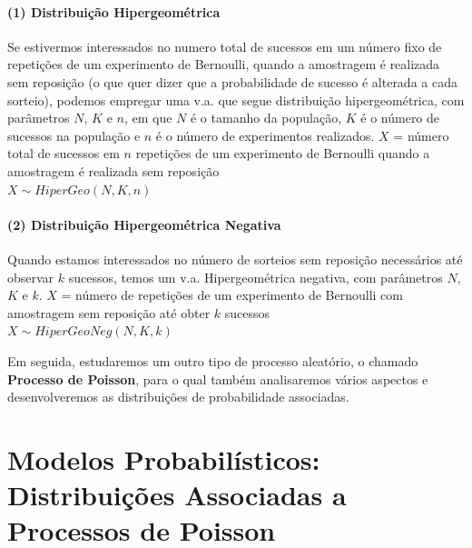 \documentclass[
]{book}
\theoremstyle{definition}
\theoremstyle{definition}
\theoremstyle{definition}
\theoremstyle{remark}
\begin{document}
\hypertarget{distribuiuxe7uxe3o-hipergeomuxe9trica-1}{%
\subsubsection*{(1) Distribuição Hipergeométrica}\label{distribuiuxe7uxe3o-hipergeomuxe9trica-1}}

Se estivermos interessados no numero total de sucessos em um número fixo de repetições de um experimento de Bernoulli, quando a amostragem é realizada sem reposição (o que quer dizer que a probabilidade de sucesso é alterada a cada sorteio), podemos empregar uma v.a. que segue distribuição hipergeométrica, com parâmetros \(N\), \(K\) e \(n\), em que \(N\) é o tamanho da população, \(K\) é o número de sucessos na população e \(n\) é o número de experimentos realizados.
\(X\) = número total de sucessos em \(n\) repetições de um experimento de Bernoulli quando a amostragem é realizada sem reposição\\
\(X \sim HiperGeo (N, K, n)\)

\hypertarget{distribuiuxe7uxe3o-hipergeomuxe9trica-negativa-1}{%
\subsubsection*{(2) Distribuição Hipergeométrica Negativa}\label{distribuiuxe7uxe3o-hipergeomuxe9trica-negativa-1}}

Quando estamos interessados no número de sorteios sem reposição necessários até observar \(k\) sucessos, temos um v.a. Hipergeométrica negativa, com parâmetros \(N\), \(K\) e \(k\).
\(X\) = número de repetições de um experimento de Bernoulli com amostragem sem reposição até obter \(k\) sucessos\\
\(X \sim HiperGeoNeg (N, K, k)\)

Em seguida, estudaremos um outro tipo de processo aleatório, o chamado \textbf{Processo de Poisson}, para o qual também analisaremos vários aspectos e desenvolveremos as distribuições de probabilidade associadas.

\hypertarget{modelos-probabiluxedsticos-distribuiuxe7uxf5es-associadas-a-processos-de-poisson}{%
\chapter{Modelos Probabilísticos: Distribuições Associadas a Processos de Poisson}\label{modelos-probabiluxedsticos-distribuiuxe7uxf5es-associadas-a-processos-de-poisson}}
\end{document}
